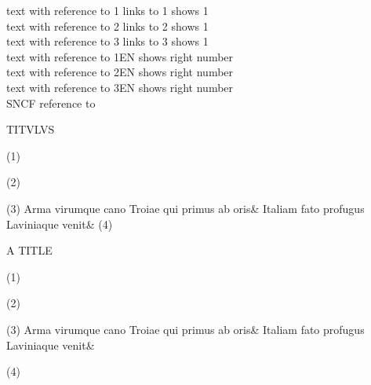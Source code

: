 \documentclass[a4paper,pagesize]{scrbook}
\begin{document}
text with reference to 1 links to 1 shows 1\\
text with reference to 2 links to 2 shows 1\\
text with reference to 3 links to 3 shows 1\\
text with reference to 1EN shows right number\\
text with reference to 2EN shows right number\\
text with reference to 3EN shows right number\\

SNCF reference to 
\begin{pages}
\begin{Leftside}
\setcounter{stanzaindentsrepetition}{1}

\beginnumbering
\pstart
TITVLVS
\pend

\numberpstarttrue
\pstart\noindent(1)\blindtext
\pend

\pstart\noindent(2)\blindtext[3]
\pend

\pstart\noindent(3)\blindtext
\pend
\numberpstartfalse
\stanza
Arma virumque cano Troiae qui primus ab oris&
Italiam fato profugus Laviniaque venit\&
\numberpstarttrue
\pstart\noindent(4)\blindtext
\pend
\endnumbering
\end{Leftside}

\begin{Rightside}
\setcounter{stanzaindentsrepetition}{1}
\beginnumbering
\pstart
A TITLE
\pend

\numberpstarttrue
\pstart\noindent(1)\blindtext
\pend

\pstart\noindent(2)\blindtext[3]
\pend

\pstart\noindent(3)\blindtext
\pend
\numberpstartfalse
\stanza
Arma virumque cano Troiae qui primus ab oris&
Italiam fato profugus Laviniaque venit\&

\numberpstarttrue
\pstart\noindent(4)\blindtext
\pend
\endnumbering
\end{Rightside}
\end{pages}
\Pages
\end{document}
